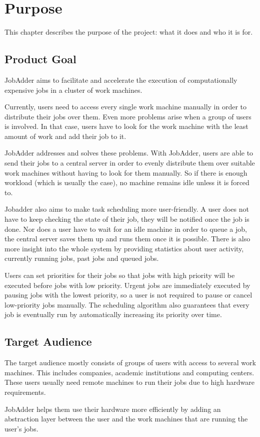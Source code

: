 \chapter{Purpose}
  This chapter describes the purpose of the project: what it does and who it is for.
  \section{Product Goal}
    JobAdder aims to facilitate and accelerate the execution of computationally
    expensive jobs in a cluster of work machines.

    Currently, users need to access every single work machine manually in order to
    distribute their jobs over them. Even more problems arise when a group of users
    is involved. In that case, users have to look for the work machine with the
    least amount of work and add their job to it.

    JobAdder addresses and solves these problems. With JobAdder, users are able to
    send their jobs to a central server in order to evenly distribute them over
    suitable work machines without having to look for them manually. So if there is
    enough workload (which is usually the case), no machine remains idle unless it
    is forced to.

    Jobadder also aims to make task scheduling more user-friendly. A user does not
    have to keep checking the state of their job, they will be notified once the job
    is done. Nor does a user have to wait for an idle machine in order to queue a
    job, the central server saves them up and runs them once it is possible. There
    is also more insight into the whole system by providing statistics about user
    activity, currently running jobs, past jobs and queued jobs.

    Users can set priorities for their jobs so that jobs with high priority will be
    executed before jobs with low priority. Urgent jobs are immediately executed by
    pausing jobs with the lowest priority, so a user is not required to pause or
    cancel low-priority jobs manually. The scheduling algorithm also guarantees that
    every job is eventually run by automatically increasing its priority over time.

  \section{Target Audience}
    The target audience mostly consists of groups of users with access to several
    work machines. This includes companies, academic institutions and computing
    centers. These users usually need remote machines to run their jobs due to high
    hardware requirements.

    JobAdder helps them use their hardware more efficiently by adding an abstraction
    layer between the user and the work machines that are running the user's jobs.
